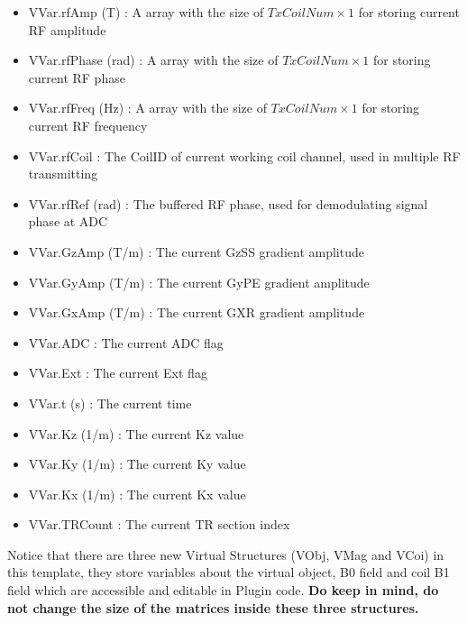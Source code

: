 \documentclass{book}%
\begin{document}
\begin{enumerate}
\begin{itemize}
	\item VVar.rfAmp (T) : A array with the size of $ TxCoilNum \times 1 $ for storing current RF amplitude
	\item VVar.rfPhase (rad) : A array with the size of $ TxCoilNum \times 1 $ for storing current RF phase
	\item VVar.rfFreq (Hz) : A array with the size of $ TxCoilNum \times 1 $ for storing current RF frequency
	\item VVar.rfCoil : The CoilID of current working coil channel, used in multiple RF transmitting
	\item VVar.rfRef (rad) : The buffered RF phase, used for demodulating signal phase at ADC
	\item VVar.GzAmp (T/m) : The current GzSS gradient amplitude
	\item VVar.GyAmp (T/m) : The current GyPE gradient amplitude
	\item VVar.GxAmp (T/m) : The current GXR gradient amplitude
	\item VVar.ADC : The current ADC flag
	\item VVar.Ext : The current Ext flag
	\item VVar.t (s) : The current time
	\item VVar.Kz (1/m) : The current Kz value
	\item VVar.Ky (1/m) : The current Ky value
	\item VVar.Kx (1/m) : The current Kx value
	\item VVar.TRCount : The current TR section index
\end{itemize}


Notice that there are three new Virtual Structures (VObj, VMag and VCoi) in this template, they store variables about the virtual object, B0 field and coil B1 field which are accessible and editable in Plugin code. \textbf{Do keep in mind, do not change the size of the matrices inside these three structures.}


\end{enumerate}
\end{document}

